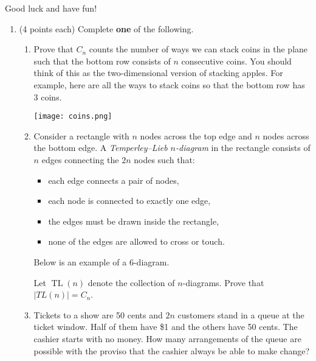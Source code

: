 \documentclass[11pt]{article}
\theoremstyle{definition}
\DeclareMathOperator{\TL}{TL}
\begin{document}
Good luck and have fun!

\newpage

\begin{enumerate}
	
\item (4 points each) Complete \textbf{one} of the following.
\begin{enumerate}
\item Prove that $C_n$ counts the number of ways we can stack coins in the plane such that the bottom row consists of $n$ consecutive coins.  You should think of this as the two-dimensional version of stacking apples.  For example, here are all the ways to stack coins so that the bottom row has 3 coins.
\begin{center}
\texttt{[image: coins.png]}
\end{center}

\item Consider a rectangle with $n$ nodes across the top edge and $n$ nodes across the bottom edge.  A \emph{Temperley--Lieb $n$-diagram} in the rectangle consists of $n$ edges connecting the $2n$ nodes such that:
\begin{itemize}
\item each edge connects a pair of nodes,
\item each node is connected to exactly one edge,
\item the edges must be drawn inside the rectangle,
\item none of the edges are allowed to cross or touch.
\end{itemize}
Below is an example of a 6-diagram.

\begin{center}
\end{center}
Let $\TL(n)$ denote the collection of $n$-diagrams. Prove that $|TL(n)|=C_n$.

\item Tickets to a show are 50 cents and $2n$ customers stand in a queue at the ticket window.  Half of them have \$1 and the others have 50 cents.  The cashier starts with no money. How many arrangements of the queue are possible with the proviso that the cashier always be able to make change?


\end{enumerate}
\end{enumerate}
\end{document}
